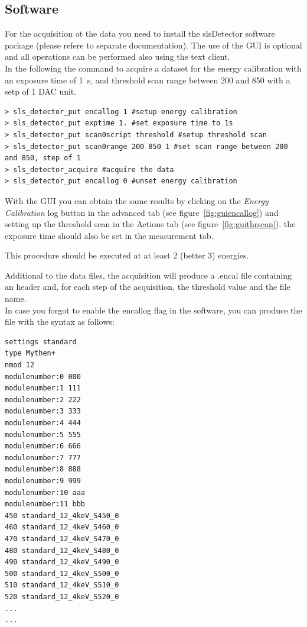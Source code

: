 \subsection{Software}

For the acquisition ot the data you need to install the slsDetector software package (please refere to separate documentation). The use of the GUI is optional and all operations can be performed also using the text client.\\

In the following the command to acquire a dataset for the energy calibration with an exposure time of 1~s, and threshold scan range between 200 and 850 with a setp of 1 DAC unit.
\begin{verbatim}
> sls_detector_put encallog 1 #setup energy calibration
> sls_detector_put exptime 1. #set exposure time to 1s
> sls_detector_put scan0script threshold #setup threshold scan
> sls_detector_put scan0range 200 850 1 #set scan range between 200 and 850, step of 1
> sls_detector_acquire #acquire the data
> sls_detector_put encallog 0 #unset energy calibration
\end{verbatim}

With the GUI you can obtain the same results by clicking on the \textit{Energy Calibration} log button in the advanced tab (see figure~\ref{fig:guiencallog}) and setting up the threshold scan in the Actions tab (see figure~\ref{fig:guithrscan}). the exposure time should also be set in the measurement tab.


This procedure should be executed at at least 2 (better 3) energies.

Additional to the data files, the acquisition will produce a .encal file containing an header and, for each step of the acquisition, the threshold value and the file name. \\
In case you forgot to enable the encallog flag in the software, you can produce the file with the syntax as follows:
\begin{verbatim}
settings standard
type Mythen+
nmod 12
modulenumber:0 000
modulenumber:1 111
modulenumber:2 222
modulenumber:3 333
modulenumber:4 444
modulenumber:5 555
modulenumber:6 666
modulenumber:7 777
modulenumber:8 888
modulenumber:9 999
modulenumber:10 aaa
modulenumber:11 bbb
450 standard_12_4keV_S450_0
460 standard_12_4keV_S460_0
470 standard_12_4keV_S470_0
480 standard_12_4keV_S480_0
490 standard_12_4keV_S490_0
500 standard_12_4keV_S500_0
510 standard_12_4keV_S510_0
520 standard_12_4keV_S520_0
...
...
\end{verbatim}




